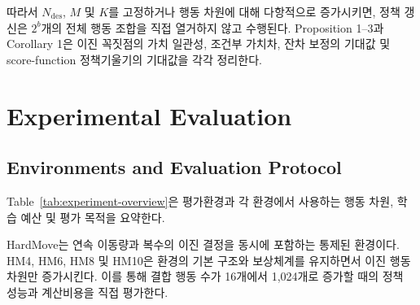 \documentclass[10pt,journal]{IEEEtran}
\begin{document}
따라서 $N_{\mathrm{des}}$, $M$ 및 $K$를 고정하거나 행동 차원에 대해 다항적으로 증가시키면, 정책 갱신은 $2^b$개의 전체 행동 조합을 직접 열거하지 않고 수행된다. Proposition 1--3과 Corollary 1은 이진 꼭짓점의 가치 일관성, 조건부 가치차, 잔차 보정의 기대값 및 score-function 정책기울기의 기대값을 각각 정리한다.

\section{Experimental Evaluation}
\label{sec:experiments}

\subsection{Environments and Evaluation Protocol}

Table~\ref{tab:experiment-overview}은 평가환경과 각 환경에서 사용하는 행동 차원, 학습 예산 및 평가 목적을 요약한다.

\begin{table}[t]
\centering
\caption{Summary of the experimental environments.}
\label{tab:experiment-overview}
\end{table}

HardMove는 연속 이동량과 복수의 이진 결정을 동시에 포함하는 통제된 환경이다. HM4, HM6, HM8 및 HM10은 환경의 기본 구조와 보상체계를 유지하면서 이진 행동 차원만 증가시킨다. 이를 통해 결합 행동 수가 16개에서 1,024개로 증가할 때의 정책 성능과 계산비용을 직접 평가한다.
\end{document}
